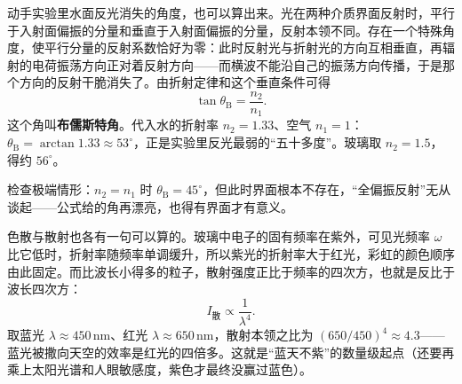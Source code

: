 \begin{mathbridge}
动手实验里水面反光消失的角度，也可以算出来。光在两种介质界面反射时，平行于入射面偏振的分量和垂直于入射面偏振的分量，反射本领不同。存在一个特殊角度，使平行分量的反射系数恰好为零：此时反射光与折射光的方向互相垂直，再辐射的电荷振荡方向正对着反射方向——而横波不能沿自己的振荡方向传播，于是那个方向的反射干脆消失了。由折射定律和这个垂直条件可得
\[
  \tan\theta_{\mathrm B} = \frac{n_2}{n_1}.
\]
这个角叫\textbf{布儒斯特角}。代入水的折射率 \(n_2=1.33\)、空气 \(n_1=1\)：\(\theta_{\mathrm B}=\arctan 1.33\approx 53^\circ\)，正是实验里反光最弱的“五十多度”。玻璃取 \(n_2=1.5\)，得约 \(56^\circ\)。

\begin{center}
\end{center}

检查极端情形：\(n_2=n_1\) 时 \(\theta_{\mathrm B}=45^\circ\)，但此时界面根本不存在，“全偏振反射”无从谈起——公式给的角再漂亮，也得有界面才有意义。
\end{mathbridge}

\begin{mathbridge}
色散与散射也各有一句可以算的。玻璃中电子的固有频率在紫外，可见光频率 \(\omega\) 比它低时，折射率随频率单调缓升，所以紫光的折射率大于红光，彩虹的颜色顺序由此固定。而比波长小得多的粒子，散射强度正比于频率的四次方，也就是反比于波长四次方：
\[
  I_{\text{散}} \propto \frac{1}{\lambda^4}.
\]
取蓝光 \(\lambda\approx 450\,\mathrm{nm}\)、红光 \(\lambda\approx 650\,\mathrm{nm}\)，散射本领之比为 \((650/450)^4\approx 4.3\)——蓝光被撒向天空的效率是红光的四倍多。这就是“蓝天不紫”的数量级起点（还要再乘上太阳光谱和人眼敏感度，紫色才最终没赢过蓝色）。
\end{mathbridge}

